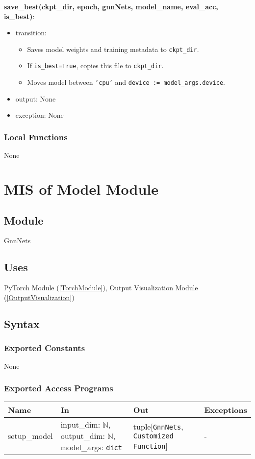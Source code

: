 \documentclass[12pt, titlepage]{article}
\begin{document}
\noindent \textbf{save\_best(ckpt\_dir, epoch, gnnNets, model\_name, eval\_acc, is\_best)}:
\begin{itemize}
  \item transition:
  \begin{itemize}
    \item Saves model weights and training metadata to \texttt{ckpt\_dir}.
    \item If \texttt{is\_best=True}, copies this file to \texttt{ckpt\_dir}.
    \item Moves model between \texttt{`cpu'} and \texttt{device := model\_args.device}.
  \end{itemize}
  \item output: None
  \item exception: None
\end{itemize}

\subsubsection{Local Functions}
None




\newpage




\section{MIS of Model Module} \label{Model}

\subsection{Module}
GnnNets

\subsection{Uses}
PyTorch Module (\ref{TorchModule}), Output Visualization Module (\ref{OutputVisualization})

\subsection{Syntax}

\subsubsection{Exported Constants}
None

\subsubsection{Exported Access Programs}
\begin{center}
\begin{tabular}{p{3.2cm} >{\raggedright\arraybackslash}p{6cm} p{4cm} p{3cm}}
\hline
\textbf{Name} & \textbf{In} & \textbf{Out} & \textbf{Exceptions} \\
\hline
setup\_model & input\_dim: \(\mathbb{N}\), output\_dim: \(\mathbb{N}\), model\_args: \texttt{dict} & tuple[\texttt{GnnNets}, \texttt{Customized Function}] & - \\
\hline
\end{tabular}
\end{center}
\end{document}
